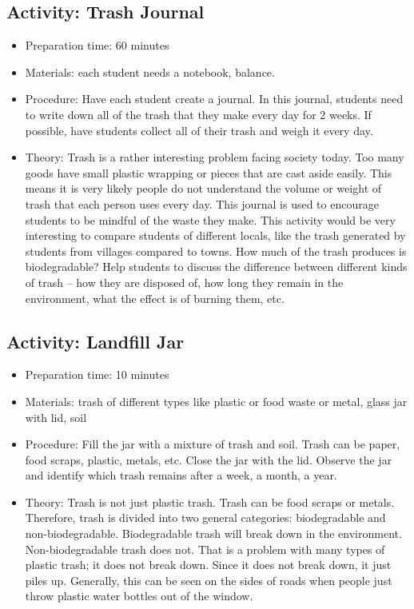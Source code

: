 \subsection{Activity: Trash Journal}
\begin{itemize}
\item{Preparation time: 60 minutes}
\item{Materials: each student needs a notebook, balance.}
\item{Procedure: Have each student create a journal. In this journal, students need to write down all of the trash that they make every day for 2 weeks. If possible, have students collect all of their trash and weigh it every day. }
\item{Theory: Trash is a rather interesting problem facing society today. Too many goods have small plastic wrapping or pieces that are cast aside easily. This means it is very likely people do not understand the volume or weight of trash that each person uses every day. This journal is used to encourage students to be mindful of the waste they make. This activity would be very interesting to compare students of different locals, like the trash generated by students from villages compared to towns. How much of the trash produces is biodegradable? Help students to discuss the difference between different kinds of trash – how they are disposed of, how long they remain in the environment, what the effect is of burning them, etc.}
\end{itemize}

\subsection{Activity: Landfill Jar}
\begin{itemize}
\item{Preparation time: 10 minutes}
\item{Materials: trash of different types like plastic or food waste or metal, glass jar with lid, soil}
\item{Procedure: Fill the jar with a mixture of trash and soil. Trash can be paper, food scraps, plastic, metals, etc. Close the jar with the lid. Observe the jar and identify which trash remains after a week, a month, a year.}
\item{Theory: Trash is not just plastic trash. Trash can be food scraps or metals. Therefore, trash is divided into two general categories: biodegradable and non-biodegradable. Biodegradable trash will break down in the environment. Non-biodegradable trash does not. That is a problem with many types of plastic trash; it does not break down. Since it does not break down, it just piles up. Generally, this can be seen on the sides of roads when people just throw plastic water bottles out of the window.}
\end{itemize}

